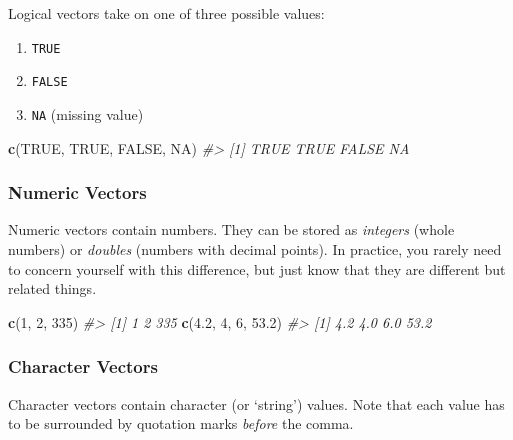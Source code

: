 \documentclass[]{book}
\newenvironment{Shaded}{\begin{snugshade}}{\end{snugshade}}
\newcommand{\CommentTok}[1]{\textcolor[rgb]{0.56,0.35,0.01}{\textit{#1}}}
\newcommand{\DecValTok}[1]{\textcolor[rgb]{0.00,0.00,0.81}{#1}}
\newcommand{\FloatTok}[1]{\textcolor[rgb]{0.00,0.00,0.81}{#1}}
\newcommand{\KeywordTok}[1]{\textcolor[rgb]{0.13,0.29,0.53}{\textbf{#1}}}
\newcommand{\NormalTok}[1]{#1}
\newcommand{\OtherTok}[1]{\textcolor[rgb]{0.56,0.35,0.01}{#1}}
\providecommand{\tightlist}{%
  \setlength{\itemsep}{0pt}\setlength{\parskip}{0pt}}
\begin{document}
Logical vectors take on one of three possible values:

\begin{enumerate}
\def\labelenumi{\arabic{enumi}.}
\tightlist
\item
  \texttt{TRUE}
\item
  \texttt{FALSE}
\item
  \texttt{NA} (missing value)
\end{enumerate}

\begin{Shaded}
\begin{Highlighting}[]
\KeywordTok{c}\NormalTok{(}\OtherTok{TRUE}\NormalTok{, }\OtherTok{TRUE}\NormalTok{, }\OtherTok{FALSE}\NormalTok{, }\OtherTok{NA}\NormalTok{)}
\CommentTok{#> [1]  TRUE  TRUE FALSE    NA}
\end{Highlighting}
\end{Shaded}

\hypertarget{numeric-vectors}{%
\subsubsection*{Numeric Vectors}\label{numeric-vectors}}

Numeric vectors contain numbers. They can be stored as \emph{integers} (whole numbers) or \emph{doubles} (numbers with decimal points). In practice, you rarely need to concern yourself with this difference, but just know that they are different but related things.

\begin{Shaded}
\begin{Highlighting}[]
\KeywordTok{c}\NormalTok{(}\DecValTok{1}\NormalTok{, }\DecValTok{2}\NormalTok{, }\DecValTok{335}\NormalTok{)}
\CommentTok{#> [1]   1   2 335}
\KeywordTok{c}\NormalTok{(}\FloatTok{4.2}\NormalTok{, }\DecValTok{4}\NormalTok{, }\DecValTok{6}\NormalTok{, }\FloatTok{53.2}\NormalTok{)}
\CommentTok{#> [1]  4.2  4.0  6.0 53.2}
\end{Highlighting}
\end{Shaded}

\hypertarget{character-vectors}{%
\subsubsection*{Character Vectors}\label{character-vectors}}

Character vectors contain character (or `string') values. Note that each value has to be surrounded by quotation marks \emph{before} the comma.
\end{document}
